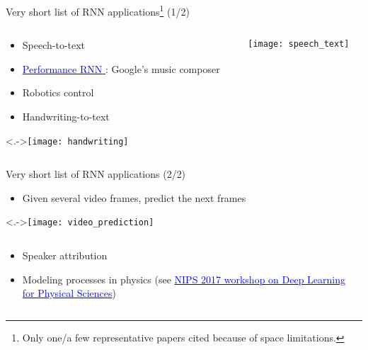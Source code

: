 \setcounter{footnote}{0}

\begin{frame}{%
    Very short list of RNN applications\footnote{%
        Only one/a few representative papers cited because of space limitations.%
    } (1/2)%
}
    \begin{columns}
        \begin{column}{0.63\textwidth}
            \begin{itemize}[<+->]
                \item Speech-to-text \citep{Battenberg17}
                \item \href{%
                    https://magenta.tensorflow.org/performance-rnn%
                }{%
                    \textcolor{blue}{Performance RNN}%
                }: Google's music composer \citep{performanceRNN}
                \item Robotics control \citep{WuJIRS07}
                \item Handwriting-to-text \citep{GravesICASSP13}
            \end{itemize}
            \vspace{5mm}

            \visible<.->{\texttt{[image: handwriting]}}
        \end{column}
        \begin{column}{0.37\textwidth}
            \texttt{[image: speech\_text]}
        \end{column}
    \end{columns}
    \vspace{2mm}
\end{frame}

\begin{frame}{Very short list of RNN applications (2/2)}
    \begin{itemize}[<+->]
        \item Given several video frames, predict the next frames
        \citep{SrivastavaICML15, Vukotic17}
    \end{itemize}
    \visible<.->{\texttt{[image: video\_prediction]}}

    \begin{columns}
        \begin{column}{0.43\textwidth}
            \begin{itemize}[<+->]
                \item Speaker attribution \citep{RenAAAICAI16}
                \item Modeling processes in physics (see \href{https://dl4physicalsciences.github.io}{\textcolor{blue}{NIPS 2017 workshop on Deep Learning for Physical Sciences}})
            \end{itemize}
        \end{column}
        \begin{column}{0.5\textwidth}
            \vspace{2mm}
        \end{column}
    \end{columns}
\end{frame}


